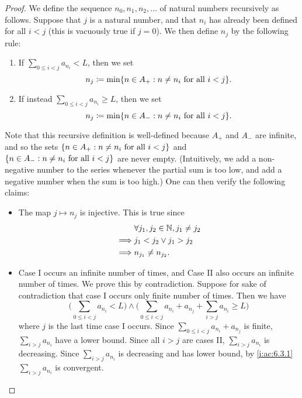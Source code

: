 \begin{proof}
  We define the sequence \(n_0, n_1, n_2, \dots\) of natural numbers recursively as follows.
  Suppose that \(j\) is a natural number, and that \(n_i\) has already been defined for all \(i < j\) (this is vacuously true if \(j = 0\)).
  We then define \(n_j\) by the following rule:
  \begin{enumerate}[label=(\Roman*)]
    \item If \(\sum_{0 \leq i < j} a_{n_i} < L\), then we set
          \[
            n_j \coloneqq \min\set{n \in A_+ : n \neq n_i \text{ for all } i < j}.
          \]
    \item If instead \(\sum_{0 \leq i < j} a_{n_i} \geq L\), then we set
          \[
            n_j \coloneqq \min\set{n \in A_- : n \neq n_i \text{ for all } i < j}.
          \]
  \end{enumerate}
  Note that this recursive definition is well-defined because \(A_+\) and \(A_-\) are infinite, and so the sets \(\left\lbrace n \in A_+ : n \neq n_i \text{ for all } i < j\right\rbrace\) and \(\left\lbrace n \in A_- : n \neq n_i \text{ for all } i < j\right\rbrace\) are never empty.
  (Intuitively, we add a non-negative number to the series whenever the partial sum is too low, and add a negative number when the sum is too high.)
  One can then verify the following claims:
  \begin{itemize}
    \item The map \(j \mapsto n_j\) is injective.
          This is true since
          \begin{align*}
                     & \forall j_1, j_2 \in \mathbb{N}, j_1 \neq j_2 \\
            \implies & j_1 < j_2 \lor j_1 > j_2              \\
            \implies & n_{j_1} \neq n_{j_2}.
          \end{align*}
    \item Case I occurs an infinite number of times, and Case II also occurs an infinite number of times.
          We prove this by contradiction.
          Suppose for sake of contradiction that case I occurs only finite number of times.
          Then we have
          \[
            \Bigg(\sum_{0 \leq i < j} a_{n_i} < L\Bigg) \land \Bigg(\sum_{0 \leq i < j} a_{n_i} + a_{n_j} + \sum_{i > j} a_{n_i} \geq L\Bigg)
          \]
          where \(j\) is the last time case I occurs.
          Since \(\sum_{0 \leq i < j} a_{n_i} + a_{n_j}\) is finite, \(\sum_{i > j} a_{n_i}\) have a lower bound.
          Since all \(i > j\) are cases II, \(\sum_{i > j} a_{n_i}\) is decreasing.
          Since \(\sum_{i > j} a_{n_i}\) is decreasing and has lower bound, by \cref{i:ac:6.3.1} \(\sum_{i > j} a_{n_i}\) is convergent.

\end{itemize}
\end{proof}
